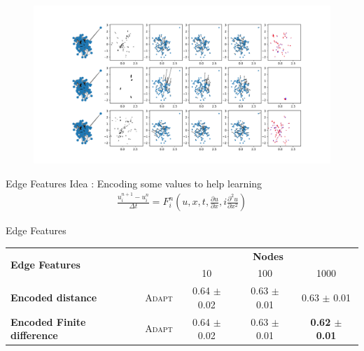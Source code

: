 \documentclass[aspectratio=169]{beamer}
\begin{document}
\begin{frame}
    \begin{figure}[htbp]
        \centering
        \includegraphics[width=\textwidth]{../results/pdfs/ba-100N-noemb0.pdf}
    \end{figure}
\end{frame}

\begin{frame}{Edge Features}
    \centering
    Idea : Encoding some values to help learning
    \begin{align*}
        \frac{u_{i}^{n + 1} - u_i^{n}}{\Delta t} = F_{i}^{n}(u,x,t, \frac{\partial u}{\partial x}, i\frac{\partial^2 u}{\partial x^{2}}    )
    \end{align*}
\end{frame}

\begin{frame}{Edge Features}
    \centering
    \begin{tabular}{lcccc} \toprule
        \multirow{2}{*}{\textbf{Edge Features}} &                            & \multicolumn{3}{c}{\textbf{Nodes}}                                                          \\ \cmidrule(lr){3-5}
                                                &                            & 10                                 & 100                   & 1000                           \\ \hline
        \textbf{Encoded distance}               & \scriptsize \textsc{Adapt} & 0.64 \tiny $\pm$ 0.02              & 0.63 \tiny $\pm$ 0.01 & 0.63 \tiny $\pm$ 0.01          \\
        \textbf{Encoded Finite difference}      & \scriptsize \textsc{Adapt} & 0.64 \tiny $\pm$ 0.02              & 0.63 \tiny $\pm$ 0.01 & \textbf{0.62 \tiny $\pm$ 0.01} \\
        \bottomrule
    \end{tabular}
\end{frame}
\end{document}
